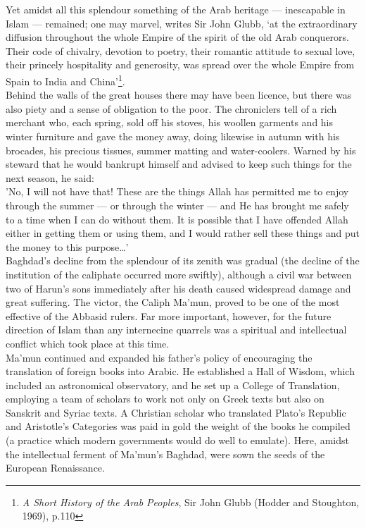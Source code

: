 \documentclass[10pt, twoside,openright]{book}
\begin{document}
Yet amidst all this splendour something of the Arab heritage --- inescapable in Islam --- remained; one 
may marvel, writes Sir John Glubb, `at the extraordinary diffusion throughout the whole Empire of the 
spirit of the old Arab conquerors. Their code of chivalry, devotion to poetry, their romantic 
attitude to sexual love, their princely hospitality and generosity, was spread over the whole Empire 
from Spain to India and China'\footnote{\emph{A Short History of the Arab Peoples}, Sir John Glubb (Hodder and Stoughton, 1969), p.110}. \\

Behind the walls of the great houses there may have been licence, but there was also piety and a 
sense of obligation to the poor. The chroniclers tell of a rich merchant who, each spring, sold off 
his stoves, his woollen garments and his winter furniture and gave the money away, doing likewise in 
autumn with his brocades, his precious tissues, summer matting and water\hyp{}coolers. Warned by his 
steward that he would bankrupt himself and advised to keep such things for the next season, he said: \\

'No, I will not have that! These are the things Allah has permitted me to enjoy through the summer --- 
or through the winter --- and He has brought me safely to a time when I can do without them. It is 
possible that I have offended Allah either in getting them or using them, and I would rather sell 
these things and put the money to this purpose\ldots{}' \\

Baghdad's decline from the splendour of its zenith was gradual (the decline of the institution of the 
caliphate occurred more swiftly), although a civil war between two of Harun's sons immediately after 
his death caused widespread damage and great suffering. The victor, the Caliph Ma'mun, proved to be 
one of the most effective of the Abbasid rulers. Far more important, however, for the future 
direction of Islam than any internecine quarrels was a spiritual and intellectual conflict which took 
place at this time. \\

Ma'mun continued and expanded his father's policy of encouraging the translation of foreign books 
into Arabic. He established a Hall of Wisdom, which included an astronomical observatory, and he set 
up a College of Translation, employing a team of scholars to work not only on Greek texts but also on 
Sanskrit and Syriac texts. A Christian scholar who translated Plato's Republic and Aristotle's 
Categories was paid in gold the weight of the books he compiled (a practice which modern governments 
would do well to emulate). Here, amidst the intellectual ferment of Ma'mun's Baghdad, were sown the 
seeds of the European Renaissance. \\
\end{document}
